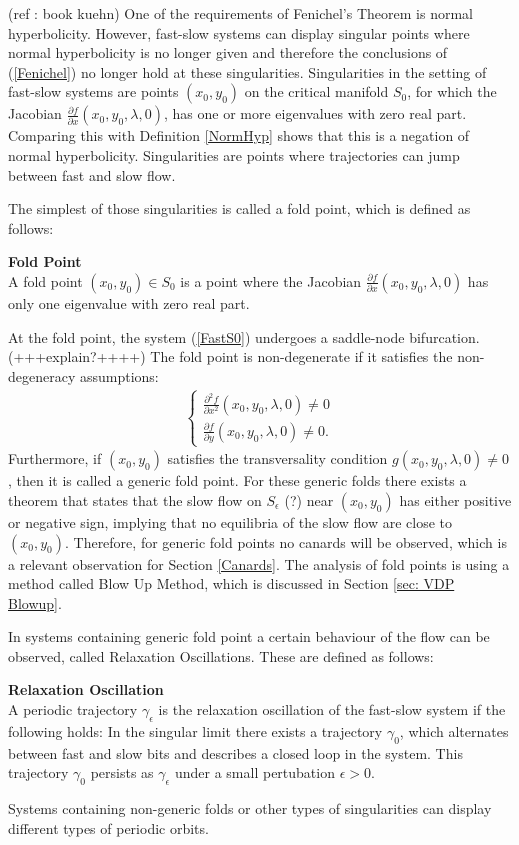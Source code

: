  (ref : book kuehn)
One of the requirements of Fenichel's Theorem is normal hyperbolicity. However, fast-slow systems can display singular points where normal hyperbolicity is no longer given and therefore the conclusions of (\ref{Fenichel}) no longer hold at these singularities.
Singularities in the setting of fast-slow systems are points $(x_0,y_0)$ on the critical manifold $S_0$, for which the Jacobian $ \frac{\partial f}{\partial x}(x_0,y_0, \lambda, 0)$, has one or more eigenvalues with zero real part. Comparing this with Definition \ref{NormHyp} shows that this is a negation of normal hyperbolicity. Singularities are points where trajectories can jump between fast and slow flow. 

The simplest of those singularities is called a fold point, which is defined as follows:
\begin{definition}{\textbf{Fold Point}} \label{FoldDef} \\
A fold point $(x_0,y_0) \in S_0$ is a point where the Jacobian $ \frac{\partial f}{\partial x}(x_0,y_0, \lambda, 0)$ has only one eigenvalue with zero real part.
\end{definition}
At the fold point, the system (\ref{FastS0}) undergoes a saddle-node bifurcation. (+++explain?++++)
The fold point is non-degenerate if it satisfies the non-degeneracy assumptions:
\begin{align} \label{NonDeg}
\begin{cases}
\frac{ \partial ^2 f}{ \partial x^2} (x_0,y_0, \lambda, 0) \neq 0 \\
\frac{\partial f}{\partial y}(x_0,y_0, \lambda, 0) \neq 0.
\end{cases}
\end{align}
Furthermore, if $(x_0,y_0)$ satisfies the transversality condition $g(x_0,y_0, \lambda, 0) \neq 0$, then it is called a generic fold point.
For these generic folds there exists a theorem that states that the slow flow on $S_\epsilon$ (?) near $(x_0,y_0)$ has either positive or negative sign, implying that no equilibria of the slow flow are close to $(x_0,y_0)$. Therefore, for generic fold points no canards will be observed, which is a relevant observation for Section \ref{Canards}.
The analysis of fold points is using a method called Blow Up Method, which is discussed in Section \ref{sec: VDP Blowup}.

In systems containing generic fold point a certain behaviour of the flow can be observed, called Relaxation Oscillations. These are defined as follows:
\begin{definition}{\textbf{Relaxation Oscillation}}\\
A periodic trajectory $\gamma_\epsilon$ is the relaxation oscillation of the fast-slow system if the following holds:
In the singular limit there exists a trajectory $\gamma_0$, which alternates between fast and slow bits and describes a closed loop in the system. This trajectory $\gamma_0$ persists as $\gamma_\epsilon$ under a small pertubation $\epsilon >0$.
\end{definition} 
Systems containing non-generic folds or other types of singularities can display different types of periodic orbits.
